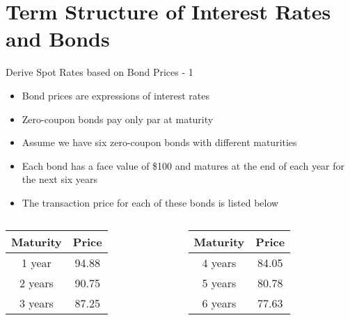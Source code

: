 \documentclass[handout, aspectratio=169]{beamer}
\subtitle{Interest Rate Fundamentals}
\begin{document}


\section{Term Structure of Interest Rates and Bonds}
\begin{frame}{Derive Spot Rates based on Bond Prices - 1}
	\pause
	\begin{itemize}
		\item Bond prices are expressions of interest rates 
		\item Zero-coupon bonds pay only par at maturity
	\end{itemize}
	\begin{example}
		\scriptsize
		\begin{itemize}
			\item Assume we have six zero-coupon bonds with different maturities
			\item Each bond has a face value of \$100 and matures at the end of each year for the next six years
			\item The transaction price for each of these bonds is listed below
		\end{itemize}
		\begin{columns}
			\begin{column}{0.5\textwidth}
				\begin{table}[h]
					\begin{tabular}{|c|c|} 
						\hline
						\textbf{Maturity} & \textbf{Price}\\				
						\hline
						1 year & 94.88 \\
						2 years & 90.75 \\
						3 years & 87.25 \\
						\hline
					\end{tabular}
				\end{table}
			\end{column}
			\begin{column}{0.5\textwidth}
				\begin{table}[h]
					\begin{tabular}{|c|c|} 
						\hline
						\textbf{Maturity} & \textbf{Price}\\				
						\hline
						4 years & 84.05 \\
						5 years & 80.78 \\
						6 years & 77.63 \\
						\hline
					\end{tabular}
				\end{table}
			\end{column}
		 \end{columns}
	\end{example}
\end{frame}
\end{document}
